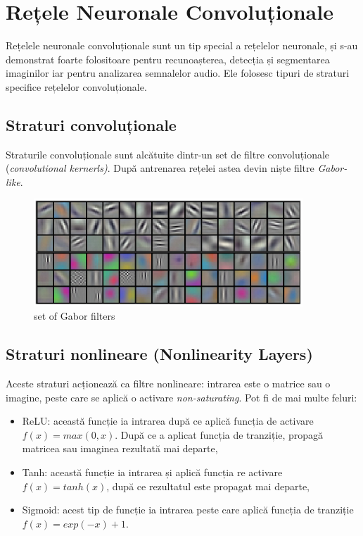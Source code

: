 \section{Rețele Neuronale Convoluționale}
Rețelele neuronale convoluționale sunt un tip special a rețelelor neuronale, și s-au demonstrat foarte folositoare pentru recunoașterea, detecția și segmentarea imaginilor iar pentru analizarea semnalelor audio.\newline
Ele folosesc tipuri de straturi specifice rețelelor convoluționale.

\subsection{Straturi convoluționale}
Straturile convoluționale sunt alcătuite dintr-un set de filtre convoluționale (\textit{convolutional kernerls)}. După antrenarea rețelei astea devin niște filtre \textit{Gabor-like}.

\begin{figure}[h!]
    	\centering
	\captionsetup{justification=centering, margin=2cm}
	\includegraphics[width=0.9\textwidth]{figures/gabor_filters.png}
	\caption{set of Gabor filters \cite{gabor_filters}}
	\label{fig:set of Gabor filters}
\end{figure}

\subsection{Straturi nonlineare (Nonlinearity Layers)}
Aceste straturi acționează ca filtre nonlineare: intrarea este o matrice sau o imagine, peste care se aplică o activare \textit{non-saturating}. Pot fi de mai multe feluri:
\begin{itemize}
	\item ReLU: această funcție ia intrarea după ce aplică funcția de activare $f(x)=max(0, x)$. După ce a aplicat funcția de tranziție, propagă matricea sau imaginea rezultată mai departe,
	\item Tanh: această funcție ia intrarea și aplică funcția re activare $f(x)=tanh(x)$, după ce rezultatul este propagat mai departe,
	\item Sigmoid: acest tip de funcție ia intrarea peste care aplică funcția de tranziție $f(x)=exp(-x)+1$.
\end{itemize}

